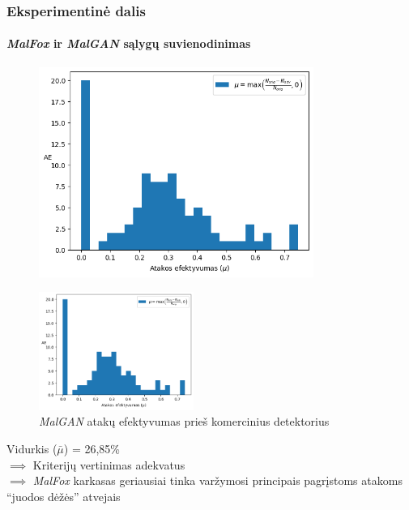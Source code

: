 \begin{frame}
    \frametitle{Eksperimentinė dalis}
    \framesubtitle{\textit{MalFox} ir \textit{MalGAN} sąlygų suvienodinimas}
     {
        \begin{figure}
            \begin{center}
                \includegraphics[width=0.8\textwidth]{resources/mu_distribution.png}
            \end{center}
        \end{figure} \pause    
    }
     {
        \begin{figure}
            \begin{small}
                \begin{center}
                    \includegraphics[width=0.45\textwidth]{resources/mu_distribution.png}
                \end{center}
                \caption{\textit{MalGAN} atakų efektyvumas prieš komercinius detektorius}
            \end{small}
        \end{figure} \pause

        Vidurkis ($\bar{\mu}$) = 26,85\;\% \pause \\ $\implies$ Kriterijų vertinimas
        adekvatus \pause \\ $\implies$ \textit{MalFox} karkasas geriausiai tinka
        varžymosi principais pagrįstoms atakoms \enquote{juodos dėžės} atvejais }
\end{frame}

